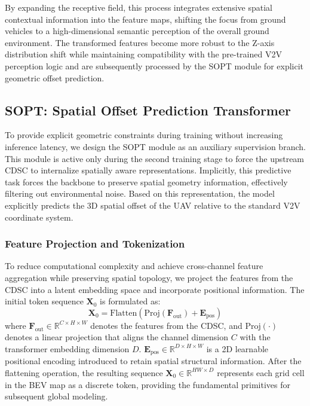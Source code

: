 \documentclass[conference]{IEEEtran}
\begin{document}
By expanding the receptive field, this process integrates extensive spatial contextual information into the feature maps, shifting the focus from ground vehicles to a high-dimensional semantic perception of the overall ground environment. The transformed features become more robust to the Z-axis distribution shift while maintaining compatibility with the pre-trained V2V perception logic and are subsequently processed by the SOPT module for explicit geometric offset prediction.



\subsection{SOPT: Spatial Offset Prediction Transformer}
To provide explicit geometric constraints during training without increasing inference latency, we design the SOPT module as an auxiliary supervision branch. This module is active only during the second training stage to force the upstream CDSC to internalize spatially aware representations. Implicitly, this predictive task forces the backbone to preserve spatial geometry information, effectively filtering out environmental noise. Based on this representation, the model explicitly predicts the 3D spatial offset of the UAV relative to the standard V2V coordinate system.

\subsubsection{Feature Projection and Tokenization}
To reduce computational complexity and achieve cross-channel feature aggregation while preserving spatial topology, we project the features from the CDSC into a latent embedding space and incorporate positional information. The initial token sequence $\mathbf{X}_0$ is formulated as:
\begin{equation}
\mathbf{X}_0 = \text{Flatten}\left( \text{Proj}(\mathbf{F}_{\text{out}}) + \mathbf{E}_{\text{pos}} \right)
\end{equation}
where $\mathbf{F}_{\text{out}} \in \mathbb{R}^{C \times H \times W}$ denotes the features from the CDSC, and $\text{Proj}(\cdot)$ denotes a linear projection that aligns the channel dimension $C$ with the transformer embedding dimension $D$. $\mathbf{E}_{\text{pos}} \in \mathbb{R}^{D \times H \times W}$ is a 2D learnable positional encoding introduced to retain spatial structural information. After the flattening operation, the resulting sequence $\mathbf{X}_0 \in \mathbb{R}^{HW \times D}$ represents each grid cell in the BEV map as a discrete token, providing the fundamental primitives for subsequent global modeling.
\end{document}
